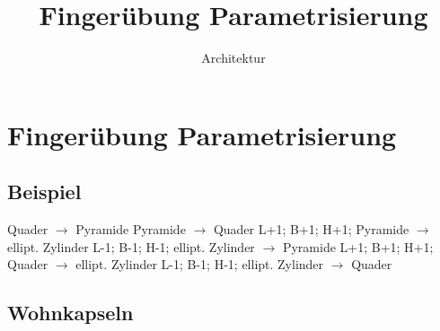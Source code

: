 \title{Fingerübung Parametrisierung}
\author{Architektur}
\date{}

\section{Fingerübung Parametrisierung}
\subsection{Beispiel}
\begin{AssignmentTable}{}
\end{AssignmentTable}
\begin{Diagram}[title={},break=false]
\AssignmentWorkedExampleGraph
\end{Diagram}
\begin{Transitions}[title={},break=false]
\AssignmentWorkedExampleLedger
  {Quader $\to$ Pyramide}
  {Pyramide $\to$ Quader}
  {L+1; B+1; H+1; Pyramide $\to$ ellipt. Zylinder}
  {L-1; B-1; H-1; ellipt. Zylinder $\to$ Pyramide}
  {L+1; B+1; H+1; Quader $\to$ ellipt. Zylinder}
  {L-1; B-1; H-1; ellipt. Zylinder $\to$ Quader}
\end{Transitions}
\clearpage
\subsection{Wohnkapseln}
\begin{AssignmentTable}{}
\end{AssignmentTable}
\begin{AssignmentTable}{}
\end{AssignmentTable}
\clearpage
\begin{Diagram}[title={},break=false]
\AssignmentCompleteGraph
\end{Diagram}
\begin{Transitions}[title={},break=false]
\AssignmentSelectedLedger
\end{Transitions}

